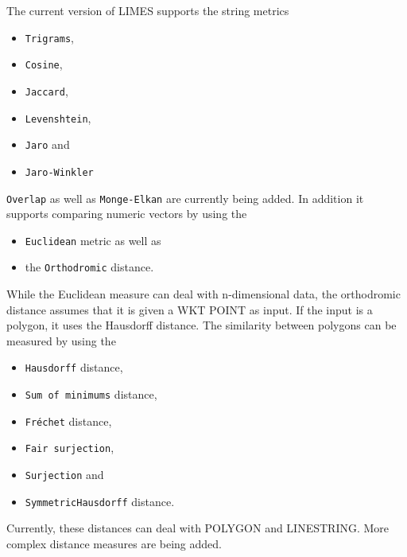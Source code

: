 \documentclass[a4paper, 11pt]{article}
\begin{document}
The current version of LIMES supports the string metrics 
\begin{itemize}
\item \texttt{Trigrams},
\item \texttt{Cosine},
\item \texttt{Jaccard}, 
\item \texttt{Levenshtein},
\item \texttt{Jaro} and
\item \texttt{Jaro-Winkler}
\end{itemize}
\texttt{Overlap} as well as \texttt{Monge-Elkan} are currently being added.
In addition it supports comparing numeric vectors by using the 
\begin{itemize}
\item \texttt{Euclidean} metric as well as 
\item the \texttt{Orthodromic} distance.
\end{itemize}
While the Euclidean measure can deal with n-dimensional data, the orthodromic distance assumes that it is given a WKT POINT as input.
If the input is a polygon, it uses the Hausdorff distance.
The similarity between polygons can be measured by using the 
\begin{itemize}
\item \texttt{Hausdorff} distance,
\item \texttt{Sum of minimums} distance,
\item \texttt{Fréchet} distance,
\item \texttt{Fair surjection},
\item \texttt{Surjection} and 
\item \texttt{SymmetricHausdorff} distance.
\end{itemize}
Currently, these distances can deal with POLYGON and LINESTRING. 
More complex distance measures are being added.
%
\end{document}
